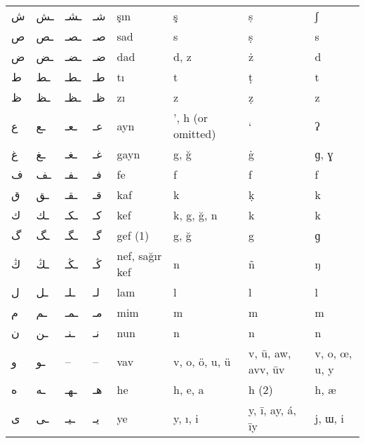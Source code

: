 \documentclass[a5paper,12pt]{scrbook}
\begin{document}
\begin{longtable}{p{2em}p{2em}p{2em}p{2em}p{2em}p{2em}p{2em}p{2em}}
\textarabic{ ش‎ } & \textarabic{ ـش‎ } & \textarabic{ ـشـ‎ } & \textarabic{ شـ‎ } & şın & ş & ș & ʃ \\
\textarabic{ ص‎ } & \textarabic{ ـص‎ } & \textarabic{ ـصـ‎ } & \textarabic{ صـ‎ } & sad & s & ṣ & s \\
\textarabic{ ض‎ } & \textarabic{ ـض‎ } & \textarabic{ ـضـ‎ } & \textarabic{ ضـ‎ } & dad & d, z & ż & d \\
\textarabic{ ط‎ } & \textarabic{ ـط‎ } & \textarabic{ ـطـ‎ } & \textarabic{ طـ‎ } & tı & t & ṭ & t \\
\textarabic{ ظ‎ } & \textarabic{ ـظ‎ } & \textarabic{ ـظـ‎ } & \textarabic{ ظـ‎ } & zı & z & ẓ & z \\
\textarabic{ ع‎ } & \textarabic{ ـع‎ } & \textarabic{ ـعـ‎ } & \textarabic{ عـ‎ } & ayn & ', h (or omitted) & ‘ & ʔ \\
\textarabic{ غ‎ } & \textarabic{ ـغ‎ } & \textarabic{ ـغـ‎ } & \textarabic{ غـ‎ } & gayn & g, ğ & ġ & ɡ, ɣ \\
\textarabic{ ف‎ } & \textarabic{ ـف‎ } & \textarabic{ ـفـ‎ } & \textarabic{ فـ‎ } & fe & f & f & f \\
\textarabic{ ق‎ } & \textarabic{ ـق‎ } & \textarabic{ ـقـ‎ } & \textarabic{ قـ‎ } & kaf & k & ḳ & k \\
\textarabic{ ك‎ } & \textarabic{ ـك‎ } & \textarabic{ ـكـ‎ } & \textarabic{ كـ‎ } & kef & k, g, ğ, n & k & k \\
\textarabic{ گ‎ } & \textarabic{ ـگ‎ } & \textarabic{ ـگـ‎ } & \textarabic{ گـ‎ } & gef (1) & g, ğ & g & ɡ \\
\textarabic{ ڭ‎ } & \textarabic{ ـڭ‎ } & \textarabic{ ـڭـ‎ } & \textarabic{ ڭـ‎ } & nef, sağır kef & n & ñ & ŋ \\
\textarabic{ ل‎ } & \textarabic{ ـل‎ } & \textarabic{ ـلـ‎ } & \textarabic{ لـ‎ } & lam & l & l & l \\
\textarabic{ م‎ } & \textarabic{ ـم‎ } & \textarabic{ ـمـ‎ } & \textarabic{ مـ‎ } & mim & m & m & m \\
\textarabic{ ن‎ } & \textarabic{ ـن‎ } & \textarabic{ ـنـ‎ } & \textarabic{ نـ‎ } & nun & n & n & n \\
\textarabic{ و‎ } & \textarabic{ ـو‎ } &  -- & -- & vav & v, o, ö, u, ü & v, ū, aw, avv, ūv & v, o, œ, u, y \\
\textarabic{ ه‎ } & \textarabic{ ـه‎ } & \textarabic{ ـهـ‎ } & \textarabic{ هـ‎ } & he & h, e, a & h (2) & h, æ \\
\textarabic{ ی‎ } & \textarabic{ ـی‎ } & \textarabic{ ـیـ‎ } & \textarabic{ یـ‎ } & ye & y, ı, i & y, ī, ay, á, īy & j, ɯ, i \\
\bottomrule
\end{longtable}
\end{document}
